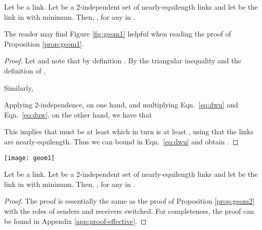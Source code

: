 \documentclass[11pt]{amsart}
\begin{document}
\begin{proposition}
Let  be a link.  Let  be a 2-independent set of
nearly-equilength links and let  be the link in  with 
minimum. Then, , for any  in .
\label{prop:geom1}
\end{proposition}
The reader may find Figure \ref{fig:geom1} helpful when reading the proof of Proposition \ref{prop:geom1}.
\begin{proof}
Let  and note that by definition .
By the triangular inequality and the definition of , 

Similarly, 

Applying 2-independence, on one hand, and multiplying Eqn.\ \ref{eq:dwu} and Eqn.\ \ref{eq:duw}, on the other hand, we have that

This implies that  must be at least  which in turn is at least , using that the links are nearly-equilength.
Thus we can bound  in Eqn.\ \ref{eq:dwu} and obtain .
\end{proof}
\begin{figure*}[ht]
	\begin{center}
		\texttt{[image: geom1]}
	\end{center}
	\caption{Displays links  and  as used in the proofs of Propositions \ref{prop:geom1} and \ref{prop:geom2}. The distances  and  that are related to each other in the Proposition's statement are represented by red dotted lines. The gray dashed lines mark distances  and  that are used in the proofs as well.}\label{fig:geom1}
\end{figure*}

\begin{proposition}
Let  be a link.  Let  be a 2-independent set of
nearly-equilength links and let  be the link in  with 
minimum. Then, , for any  in .
\label{prop:geom2}
\end{proposition}


\begin{proof}
The proof is essentially the same as the proof of Proposition \ref{prop:geom2} with the roles of senders and receivers switched. For completeness, the proof can be found in Appendix \ref{app:proof-effective}.
\end{proof}
\end{document}
